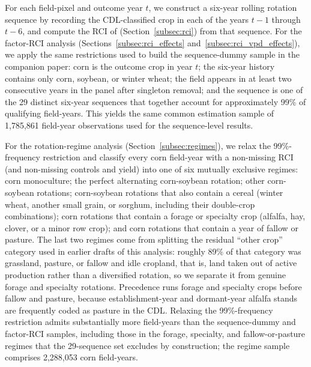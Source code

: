 \documentclass[12pt,letterpaper]{article}
\theoremstyle{remark}
\theoremstyle{remark}
\theoremstyle{plain}
\theoremstyle{definition}
\begin{document}
For each field-pixel and outcome year $t$, we construct a six-year rolling rotation sequence by recording the CDL-classified crop in each of the years $t-1$ through $t-6$, and compute the RCI of \citet{socolar2021} (Section~\ref{subsec:rci}) from that sequence. For the factor-RCI analysis (Sections~\ref{subsec:rci_effects} and~\ref{subsec:rci_vpd_effects}), we apply the same restrictions used to build the sequence-dummy sample in the companion paper: corn is the outcome crop in year $t$; the six-year history contains only corn, soybean, or winter wheat; the field appears in at least two consecutive years in the panel after singleton removal; and the sequence is one of the 29 distinct six-year sequences that together account for approximately 99\% of qualifying field-years. This yields the same common estimation sample of 1,785,861 field-year observations used for the sequence-level results.

For the rotation-regime analysis (Section~\ref{subsec:regimes}), we relax the 99\%-frequency restriction and classify every corn field-year with a non-missing RCI (and non-missing controls and yield) into one of six mutually exclusive regimes: corn monoculture; the perfect alternating corn-soybean rotation; other corn-soybean rotations; corn-soybean rotations that also contain a cereal (winter wheat, another small grain, or sorghum, including their double-crop combinations); corn rotations that contain a forage or specialty crop (alfalfa, hay, clover, or a minor row crop); and corn rotations that contain a year of fallow or pasture. The last two regimes come from splitting the residual ``other crop'' category used in earlier drafts of this analysis: roughly 89\% of that category was grassland, pasture, or fallow and idle cropland, that is, land taken out of active production rather than a diversified rotation, so we separate it from genuine forage and specialty rotations. Precedence runs forage and specialty crops before fallow and pasture, because establishment-year and dormant-year alfalfa stands are frequently coded as pasture in the CDL. Relaxing the 99\%-frequency restriction admits substantially more field-years than the sequence-dummy and factor-RCI samples, including those in the forage, specialty, and fallow-or-pasture regimes that the 29-sequence set excludes by construction; the regime sample comprises 2,288,053 corn field-years.
\end{document}
